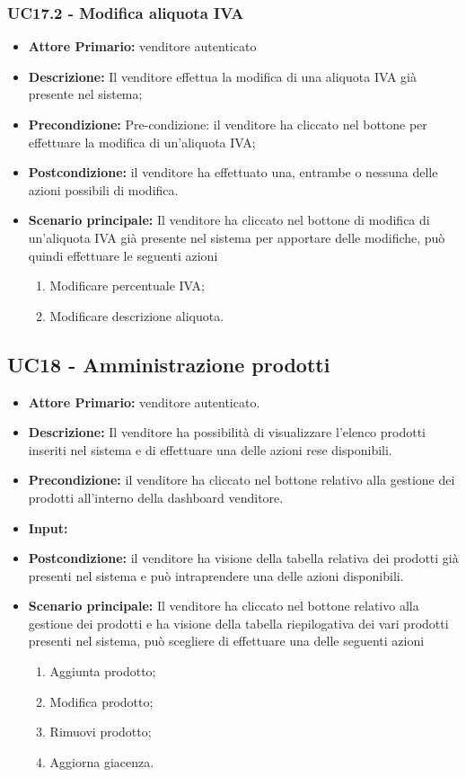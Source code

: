 \subsubsection{UC17.2 - Modifica aliquota IVA}
\begin{itemize}
    \item \textbf{Attore Primario:}  venditore autenticato
    \item \textbf{Descrizione:} Il venditore effettua la modifica di una aliquota IVA già presente nel sistema;
    \item \textbf{Precondizione:} Pre-condizione: il venditore ha cliccato nel bottone per effettuare la modifica di un’aliquota IVA;
    \item \textbf{Postcondizione:} il venditore ha effettuato una, entrambe o nessuna delle azioni possibili di modifica. 
    \item \textbf{Scenario principale:} Il venditore ha cliccato nel bottone di modifica di un’aliquota IVA già presente nel sistema per apportare delle modifiche, può quindi effettuare le seguenti azioni
    \begin{enumerate}
        \item Modificare percentuale IVA;
        \item Modificare descrizione aliquota.
    \end{enumerate}
\end{itemize}



\subsection{UC18 - Amministrazione prodotti}
\begin{itemize}
    \item \textbf{Attore Primario:}  venditore autenticato.
    \item \textbf{Descrizione:} Il venditore ha possibilità di visualizzare l’elenco prodotti inseriti nel sistema e di effettuare una delle azioni rese disponibili.
    \item \textbf{Precondizione:} il venditore ha cliccato nel bottone relativo alla gestione dei prodotti all’interno della dashboard venditore.
    \item \textbf{Input:}
    \item \textbf{Postcondizione:} il venditore ha visione della tabella relativa dei prodotti già presenti nel sistema e può intraprendere una delle azioni disponibili.
    \item \textbf{Scenario principale:} Il venditore ha cliccato nel bottone relativo alla gestione dei prodotti e ha visione della tabella riepilogativa dei vari prodotti presenti nel sistema, può scegliere di effettuare una delle seguenti azioni 
    \begin{enumerate}
        \item Aggiunta prodotto;
        \item Modifica prodotto;
        \item Rimuovi prodotto;
        \item Aggiorna giacenza.
    \end{enumerate}
\end{itemize}


